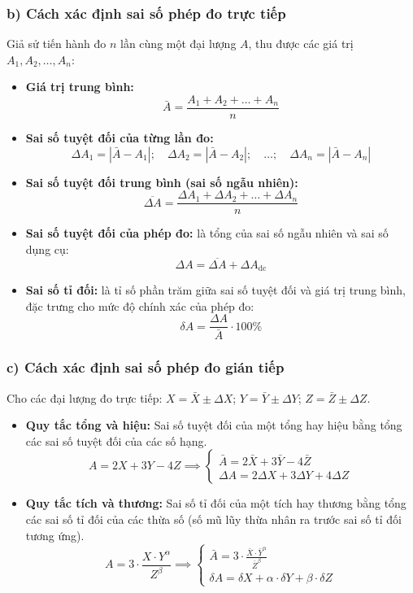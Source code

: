 \subsubsection*{b) Cách xác định sai số phép đo trực tiếp}
Giả sử tiến hành đo $n$ lần cùng một đại lượng $A$, thu được các giá trị $A_1, A_2, \dots, A_n$:
\begin{itemize}
    \item \textbf{Giá trị trung bình:}
    \[
    \bar{A} = \frac{A_1 + A_2 + \dots + A_n}{n}
    \]
    \item \textbf{Sai số tuyệt đối của từng lần đo:}
    \[
    \Delta A_1 = |\bar{A} - A_1|;\quad \Delta A_2 = |\bar{A} - A_2|;\quad \dots;\quad \Delta A_n = |\bar{A} - A_n|
    \]
    \item \textbf{Sai số tuyệt đối trung bình (sai số ngẫu nhiên):}
    \[
    \overline{\Delta A} = \frac{\Delta A_1 + \Delta A_2 + \dots + \Delta A_n}{n}
    \]
    \item \textbf{Sai số tuyệt đối của phép đo:} là tổng của sai số ngẫu nhiên và sai số dụng cụ:
    \[
    \Delta A = \overline{\Delta A} + \Delta A_{\text{dc}}
    \]
    \item \textbf{Sai số tỉ đối:} là tỉ số phần trăm giữa sai số tuyệt đối và giá trị trung bình, đặc trưng cho mức độ chính xác của phép đo:
    \[
    \delta A = \frac{\Delta A}{\bar{A}} \cdot 100\%
    \]
\end{itemize}

\subsubsection*{c) Cách xác định sai số phép đo gián tiếp}
Cho các đại lượng đo trực tiếp: $X = \bar{X} \pm \Delta X$; $Y = \bar{Y} \pm \Delta Y$; $Z = \bar{Z} \pm \Delta Z$.
\begin{itemize}
    \item \textbf{Quy tắc tổng và hiệu:} Sai số tuyệt đối của một tổng hay hiệu bằng tổng các sai số tuyệt đối của các số hạng.
    \[
    A = 2X + 3Y - 4Z \implies
    \begin{cases}
    \bar{A} = 2\bar{X} + 3\bar{Y} - 4\bar{Z} \\
    \Delta A = 2\Delta X + 3\Delta Y + 4\Delta Z
    \end{cases}
    \]
    \item \textbf{Quy tắc tích và thương:} Sai số tỉ đối của một tích hay thương bằng tổng các sai số tỉ đối của các thừa số (số mũ lũy thừa nhân ra trước sai số tỉ đối tương ứng).
    \[
    A = 3 \cdot \frac{X \cdot Y^\alpha}{Z^\beta} \implies
    \begin{cases}
    \bar{A} = 3 \cdot \frac{\bar{X} \cdot \bar{Y}^\alpha}{\bar{Z}^\beta} \\
    \delta A = \delta X + \alpha \cdot \delta Y + \beta \cdot \delta Z
    \end{cases}
    \]
\end{itemize}

